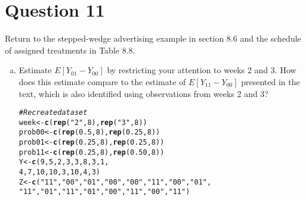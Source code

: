 \documentclass[11pt,notitlepage]{article}\usepackage[]{graphicx}\usepackage[]{color}
\makeatletter
\newcommand{\hlnum}[1]{\textcolor[rgb]{0.686,0.059,0.569}{#1}}%
\newcommand{\hlstr}[1]{\textcolor[rgb]{0.192,0.494,0.8}{#1}}%
\newcommand{\hlcom}[1]{\textcolor[rgb]{0.678,0.584,0.686}{\textit{#1}}}%
\newcommand{\hlstd}[1]{\textcolor[rgb]{0.345,0.345,0.345}{#1}}%
\newcommand{\hlkwb}[1]{\textcolor[rgb]{0.69,0.353,0.396}{#1}}%
\newcommand{\hlkwd}[1]{\textcolor[rgb]{0.737,0.353,0.396}{\textbf{#1}}}%
\newenvironment{kframe}{%
 \def\at@end@of@kframe{}%
 \ifinner\ifhmode%
  \def\at@end@of@kframe{\end{minipage}}%
  \begin{minipage}{\columnwidth}%
 \fi\fi%
 \def\FrameCommand##1{\hskip\@totalleftmargin \hskip-\fboxsep
 \colorbox{shadecolor}{##1}\hskip-\fboxsep
     \hskip-\linewidth \hskip-\@totalleftmargin \hskip\columnwidth}%
 \MakeFramed {\advance\hsize-\width
   \@totalleftmargin\z@ \linewidth\hsize
   \@setminipage}}%
 {\par\unskip\endMakeFramed%
 \at@end@of@kframe}
\newenvironment{knitrout}{}{} %
\makeatother
\begin{document}
\section*{Question 11}
Return to the stepped-wedge advertising example in section 8.6 and the schedule of assigned treatments in Table 8.8.
\begin{enumerate}[a)]
\item Estimate $E[Y_{01}-Y_{00}]$ by restricting your attention to weeks 2 and 3. How does this estimate compare to the estimate of $E[Y_{11} - Y_{00}]$ presented in the text, which is also identified using observations from weeks 2 and 3?

\begin{knitrout}
\color{fgcolor}\begin{kframe}
\begin{alltt}
\hlcom{# Recreate dataset}
\hlstd{week} \hlkwb{<-} \hlkwd{c}\hlstd{(}\hlkwd{rep}\hlstd{(}\hlstr{"2"}\hlstd{,} \hlnum{8}\hlstd{),} \hlkwd{rep}\hlstd{(}\hlstr{"3"}\hlstd{,} \hlnum{8}\hlstd{))}
\hlstd{prob00} \hlkwb{<-} \hlkwd{c}\hlstd{(}\hlkwd{rep}\hlstd{(}\hlnum{0.5}\hlstd{,} \hlnum{8}\hlstd{),} \hlkwd{rep}\hlstd{(}\hlnum{0.25}\hlstd{,} \hlnum{8}\hlstd{))}
\hlstd{prob01} \hlkwb{<-} \hlkwd{c}\hlstd{(}\hlkwd{rep}\hlstd{(}\hlnum{0.25}\hlstd{,} \hlnum{8}\hlstd{),} \hlkwd{rep}\hlstd{(}\hlnum{0.25}\hlstd{,} \hlnum{8}\hlstd{))}
\hlstd{prob11} \hlkwb{<-} \hlkwd{c}\hlstd{(}\hlkwd{rep}\hlstd{(}\hlnum{0.25}\hlstd{,} \hlnum{8}\hlstd{),} \hlkwd{rep}\hlstd{(}\hlnum{0.50}\hlstd{,} \hlnum{8}\hlstd{))}
\hlstd{Y} \hlkwb{<-} \hlkwd{c}\hlstd{(}\hlnum{9}\hlstd{,}\hlnum{5}\hlstd{,}\hlnum{2}\hlstd{,}\hlnum{3}\hlstd{,}\hlnum{3}\hlstd{,}\hlnum{8}\hlstd{,}\hlnum{3}\hlstd{,}\hlnum{1}\hlstd{,}
       \hlnum{4}\hlstd{,}\hlnum{7}\hlstd{,}\hlnum{10}\hlstd{,}\hlnum{10}\hlstd{,}\hlnum{3}\hlstd{,}\hlnum{10}\hlstd{,}\hlnum{4}\hlstd{,}\hlnum{3}\hlstd{)}
\hlstd{Z} \hlkwb{<-} \hlkwd{c}\hlstd{(}\hlstr{"11"}\hlstd{,} \hlstr{"00"}\hlstd{,} \hlstr{"01"}\hlstd{,} \hlstr{"00"}\hlstd{,} \hlstr{"00"}\hlstd{,} \hlstr{"11"}\hlstd{,} \hlstr{"00"}\hlstd{,} \hlstr{"01"}\hlstd{,}
       \hlstr{"11"}\hlstd{,} \hlstr{"01"}\hlstd{,} \hlstr{"11"}\hlstd{,} \hlstr{"01"}\hlstd{,} \hlstr{"00"}\hlstd{,} \hlstr{"11"}\hlstd{,} \hlstr{"00"}\hlstd{,} \hlstr{"11"}\hlstd{)}


\end{alltt}
\end{kframe}
\end{knitrout}
\end{enumerate}
\end{document}
